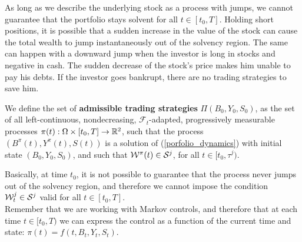 As long as we describe the underlying stock as a process with jumps, we cannot guarantee that the portfolio stays
solvent for all $t \in [t_0,T]$. Holding short positions, it is possible that a sudden increase in the value of the stock 
can cause the total wealth to jump instantaneously out of the solvency region. 
The same can happen with a downward jump when the investor is long in stocks and negative in cash. 
The sudden decrease of the stock's price makes him unable to pay his debts.
If the investor goes bankrupt, there are no trading strategies to save him.
\begin{Definition}\label{set_trading_strategies}
We define the set of \textbf{admissible trading strategies} $\Pi(B_0,Y_0,S_0)$,   
as the set of all left-continuous, nondecreasing, $\mathcal{F}_t$-adapted, progressively measurable processes  
$\pi(t): \Omega \times [t_0,T]\to \mathbb{R}^2$, such that the process $(B^\pi(t),Y^\pi(t),S(t))$ is a solution of (\ref{porfolio_dynamics}) 
with initial state $( B_0,Y_0,S_0 )$, and such that $\mathcal{W}^{\pi}(t) \in \mathcal{S}^j$, for all $t\in [t_0,\tau^j)$. 
\end{Definition}
Basically, at time $t_0$, it is not possible to guarantee that the process never jumps out of the solvency region, and therefore we cannot impose the condition  
$\mathcal{W}^j_t \in \mathcal{S}^j$ valid for all $t \in [t_0,T] $. \\
Remember that we are working with Markov controls, and therefore that at each time $t\in [t_0,T)$
we can express the control as a function of the current time and state: $\pi(t) = f(t,B_t,Y_t,S_t)$. 

